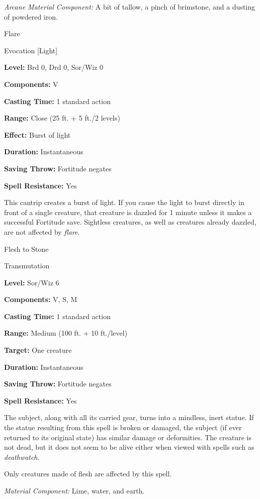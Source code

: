 \documentclass{article}
\begin{document}
\textit{Arcane Material Component: }A bit of tallow, a pinch of brimstone, and 
a dusting of powdered iron.

\vspace{12pt}
Flare

Evocation [Light]

\textbf{Level:} Brd 0, Drd 0, Sor/Wiz 0

\textbf{Components:} V

\textbf{Casting Time:} 1 standard action

\textbf{Range:} Close (25 ft. + 5 ft./2 levels)

\textbf{Effect:} Burst of light

\textbf{Duration:} Instantaneous

\textbf{Saving Throw:} Fortitude negates

\textbf{Spell Resistance:} Yes

This cantrip creates a burst of light. If you cause the light to burst directly 
in front of a single creature, that creature is dazzled for 1 minute unless it 
makes a successful Fortitude save. Sightless creatures, as well as creatures already 
dazzled, are not affected by \textit{flare}.

\vspace{12pt}
Flesh to Stone

Transmutation

\textbf{Level:} Sor/Wiz 6

\textbf{Components:} V, S, M

\textbf{Casting Time:} 1 standard action

\textbf{Range: }Medium (100 ft. + 10 ft./level)

\textbf{Target:} One creature

\textbf{Duration:} Instantaneous

\textbf{Saving Throw:} Fortitude negates

\textbf{Spell Resistance:} Yes

The subject, along with all its carried gear, turns into a mindless, inert statue. 
If the statue resulting from this spell is broken or damaged, the subject (if ever 
returned to its original state) has similar damage or deformities. The creature 
is not dead, but it does not seem to be alive either when viewed with spells such 
as \textit{deathwatch}.

Only creatures made of flesh are affected by this spell.

\textit{Material Component: }Lime, water, and earth.
\end{document}
